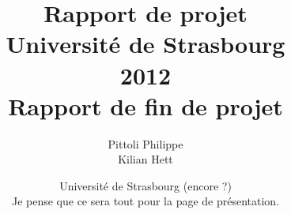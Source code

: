 \documentclass[12pt,a4paper,utf8x]{report}
\title
{
	\normalsize{Rapport de projet\\
	Université de Strasbourg\\
	2012}\\
	\vspace{15mm}
	\Huge{Rapport de fin de projet}
}
\author{Pittoli Philippe\\
		Kilian Hett
	\vspace{45mm}
}
\date{	
	\normalsize{Université de Strasbourg (encore ?)\\
	\vspace{5mm}	
	Je pense que ce sera tout pour la page de présentation.
	}
}
\begin{document}
\maketitle

%

\tableofcontents
\clearpage

\begin{onehalfspace}





%
%
%
%
%



\end{onehalfspace}

\nocite{*}



\printindex

\appendix
\end{document}
